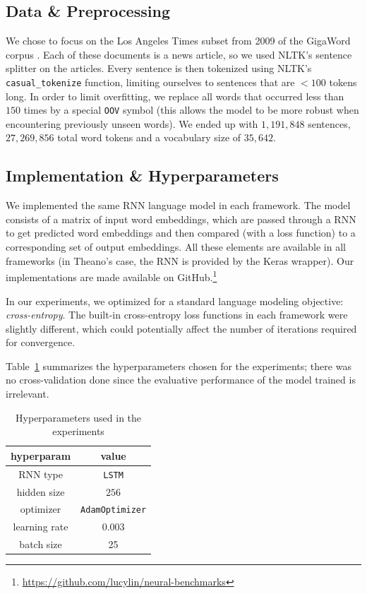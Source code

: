 \documentclass{article}
\begin{document}
\subsection{Data \& Preprocessing}
We chose to focus on the Los Angeles Times subset from 2009 of the GigaWord corpus \cite{gigaword}. Each of these documents is a news article, so we used NLTK’s \cite{nltk} sentence splitter on the articles. Every sentence is then tokenized using NLTK’s \verb!casual_tokenize! function, limiting ourselves to sentences that are $<100$ tokens long. In order to limit overfitting, we replace all words that occurred less than $150$ times by a special \verb!OOV! symbol (this allows the model to be more robust when encountering previously unseen words). We ended up with $1,191,848$ sentences, $27,269,856$ total word tokens and a vocabulary size of $35,642$.

\subsection{Implementation \& Hyperparameters}
We implemented the same RNN language model in each framework. The model consists of a matrix of input word embeddings, which are passed through a RNN to get predicted word embeddings and then compared (with a loss function) to a corresponding set of output embeddings. All these elements are available in all frameworks (in Theano's case, the RNN is provided by the Keras wrapper). Our implementations are made available on GitHub.\footnote{\url{https://github.com/lucylin/neural-benchmarks}}

In our experiments, we optimized for a standard language modeling objective: \textit{cross-entropy}. The built-in cross-entropy loss functions in each framework were slightly different, which could potentially affect the number of iterations required for convergence.

Table~\ref{tab:hyperparams} summarizes the hyperparameters chosen for the experiments; there was no cross-validation done since the evaluative performance of the model trained is irrelevant.
\begin{table}\begin{center}
\begin{tabular}{cc}
\textbf{hyperparam} & \textbf{value} \\\hline
RNN type & \texttt{LSTM} \\
hidden size & $256$ \\
optimizer & \texttt{AdamOptimizer} \\
learning rate & $0.003$ \\
batch size & 25 \\
\end{tabular}
\caption{\label{tab:hyperparams}Hyperparameters used in the experiments}
\end{center}\end{table}
\end{document}
